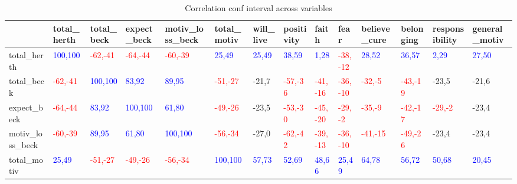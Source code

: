 \begin{table}[H] 
\tiny 
 \caption{Correlation conf interval across variables} 
 \label{correlation_conf_interval_across_variables} 
 \centering 
 \begin{adjustbox}{angle=90}  
 \begin{tabular} {|l|l|l|l|l|l|l|l|l|l|l|l|l|l|}  
 \hline 
  &  total\_herth & total\_beck & expect\_beck & motiv\_loss\_beck & total\_motiv & will\_live & positivity & faith & fear & believe\_cure & belonging & responsibility & general\_motiv \\ 
 \hline 
 total\_herth & {\textcolor{blue}{100,100}} & {\textcolor{red}{-62,-41}} & {\textcolor{red}{-64,-44}} & {\textcolor{red}{-60,-39}} & {\textcolor{blue}{25,49}} & {\textcolor{blue}{25,49}} & {\textcolor{blue}{38,59}} & {\textcolor{blue}{1,28}} & {\textcolor{red}{-38,-12}} & {\textcolor{blue}{28,52}} & {\textcolor{blue}{36,57}} & {\textcolor{blue}{2,29}} & {\textcolor{blue}{27,50}} \\ 
 \hline 
 total\_beck & {\textcolor{red}{-62,-41}} & {\textcolor{blue}{100,100}} & {\textcolor{blue}{83,92}} & {\textcolor{blue}{89,95}} & {\textcolor{red}{-51,-27}} & -21,7 & {\textcolor{red}{-57,-36}} & {\textcolor{red}{-41,-16}} & {\textcolor{red}{-36,-10}} & {\textcolor{red}{-32,-5}} & {\textcolor{red}{-43,-19}} & -23,5 & -21,6 \\ 
 \hline 
 expect\_beck & {\textcolor{red}{-64,-44}} & {\textcolor{blue}{83,92}} & {\textcolor{blue}{100,100}} & {\textcolor{blue}{61,80}} & {\textcolor{red}{-49,-26}} & -23,5 & {\textcolor{red}{-53,-30}} & {\textcolor{red}{-45,-20}} & {\textcolor{red}{-29,-2}} & {\textcolor{red}{-35,-9}} & {\textcolor{red}{-42,-17}} & {\textcolor{red}{-29,-2}} & -23,4 \\ 
 \hline 
 motiv\_loss\_beck & {\textcolor{red}{-60,-39}} & {\textcolor{blue}{89,95}} & {\textcolor{blue}{61,80}} & {\textcolor{blue}{100,100}} & {\textcolor{red}{-56,-34}} & -27,0 & {\textcolor{red}{-62,-42}} & {\textcolor{red}{-39,-13}} & {\textcolor{red}{-36,-10}} & {\textcolor{red}{-41,-15}} & {\textcolor{red}{-49,-26}} & -23,4 & -23,4 \\ 
 \hline 
 total\_motiv & {\textcolor{blue}{25,49}} & {\textcolor{red}{-51,-27}} & {\textcolor{red}{-49,-26}} & {\textcolor{red}{-56,-34}} & {\textcolor{blue}{100,100}} & {\textcolor{blue}{57,73}} & {\textcolor{blue}{52,69}} & {\textcolor{blue}{48,66}} & {\textcolor{blue}{25,49}} & {\textcolor{blue}{64,78}} & {\textcolor{blue}{56,72}} & {\textcolor{blue}{50,68}} & {\textcolor{blue}{20,45}} \\ 

\end{tabular}
\end{adjustbox}
\end{table}
